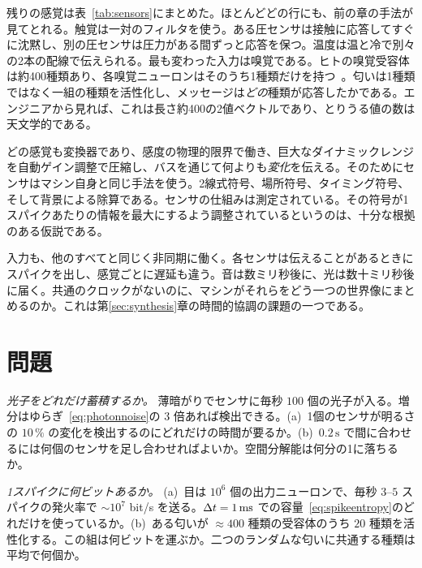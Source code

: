 残りの感覚は表~\ref{tab:sensors}にまとめた。ほとんどどの行にも、前の章の手法が見てとれる。触覚は一対のフィルタを使う。ある圧センサは接触に応答してすぐに沈黙し、別の圧センサは圧力がある間ずっと応答を保つ。温度は温と冷で別々の2本の配線で伝えられる。最も変わった入力は嗅覚である。ヒトの嗅覚受容体は約400種類あり、各嗅覚ニューロンはそのうち1種類だけを持つ~\cite{Mombaerts2004}。匂いは1種類ではなく一組の種類を活性化し、メッセージは\emph{どの}種類が応答したかである。エンジニアから見れば、これは長さ約400の2値ベクトルであり、とりうる値の数は天文学的である。

\begin{keyblock}
\begin{proposition}[マシンの入力]
\label{prop:sensors}
どの感覚も変換器であり、感度の物理的限界で働き、巨大なダイナミックレンジを自動ゲイン調整で圧縮し、バスを通じて何よりも\emph{変化}を伝える。そのためにセンサはマシン自身と同じ手法を使う。2線式符号、場所符号、タイミング符号、そして背景による除算である。センサの仕組みは測定されている。その符号が1スパイクあたりの情報を最大にするよう調整されているというのは、十分な根拠のある仮説である。
\end{proposition}
\end{keyblock}

入力も、他のすべてと同じく非同期に働く。各センサは伝えることがあるときにスパイクを出し、感覚ごとに遅延も違う。音は数ミリ秒後に、光は数十ミリ秒後に届く。共通のクロックがないのに、マシンがそれらをどう一つの世界像にまとめるのか。これは第\ref{sec:synthesis}章の時間的協調の課題の一つである。

\section{問題}

\begin{exercise}[\lvlA]
\label{ex:11:1}
\emph{光子をどれだけ蓄積するか。} 薄暗がりでセンサに毎秒 $100$ 個の光子が入る。増分はゆらぎ~\eqref{eq:photonnoise}の $3$ 倍あれば検出できる。(a)~1個のセンサが明るさの $10\,\%$ の変化を検出するのにどれだけの時間が要るか。(b)~$0.2\,\text{s}$ で間に合わせるには何個のセンサを足し合わせればよいか。空間分解能は何分の1に落ちるか。
\end{exercise}

\begin{exercise}[\lvlA]
\label{ex:11:2}
\emph{1スパイクに何ビットあるか。} (a)~目は $10^6$ 個の出力ニューロンで、毎秒 $3$--$5$ スパイクの発火率で $\sim10^7$ bit/s を送る。$\Delta t=1\,\text{ms}$ での容量~\eqref{eq:spikeentropy}のどれだけを使っているか。(b)~ある匂いが $\approx400$ 種類の受容体のうち $20$ 種類を活性化する。この組は何ビットを運ぶか。二つのランダムな匂いに共通する種類は平均で何個か。
\end{exercise}

